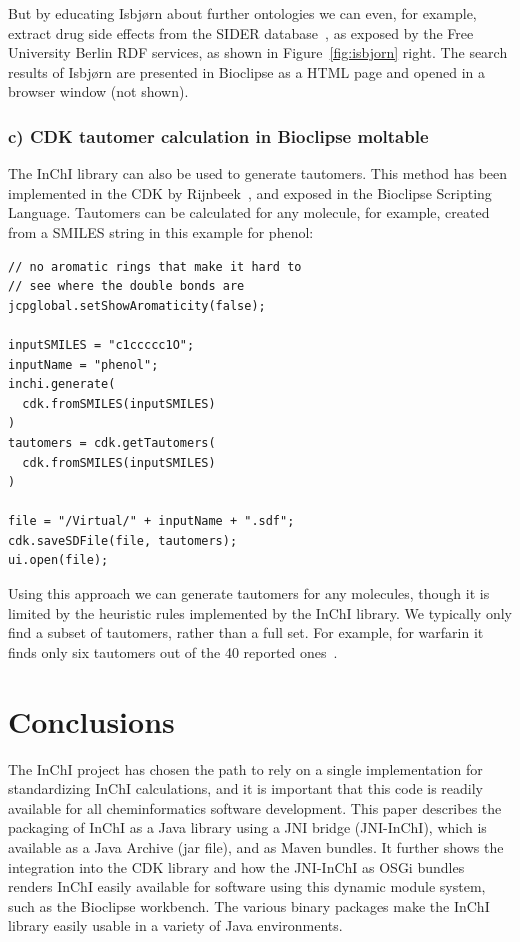 \documentclass[10pt]{bmc_article}
\newenvironment{bmcformat}{\fussy\setboolean{publ}{true}}{\fussy}
\begin{document}
\begin{bmcformat}
But by educating Isbjørn about further ontologies we can even, for example, extract drug side effects
from the SIDER database~\cite{Kuhn2010}, as exposed by the Free University Berlin RDF services,
as shown in Figure~\ref{fig:isbjorn} right. The search results of Isbjørn are presented in Bioclipse
as a HTML page and opened in a browser window (not shown).

\subsubsection*{c) CDK tautomer calculation in Bioclipse moltable}

The InChI library can also be used to generate tautomers\cite{Thalheim2010}. This method has been
implemented in the CDK by Rijnbeek~\cite{Rijnbeek2011}, and exposed in the Bioclipse Scripting Language.
Tautomers can be calculated for any molecule, for example, created from a SMILES string in this
example for phenol:

\begin{verbatim}
// no aromatic rings that make it hard to
// see where the double bonds are
jcpglobal.setShowAromaticity(false);

inputSMILES = "c1ccccc1O";
inputName = "phenol";
inchi.generate(
  cdk.fromSMILES(inputSMILES)
)
tautomers = cdk.getTautomers(
  cdk.fromSMILES(inputSMILES)
)

file = "/Virtual/" + inputName + ".sdf";
cdk.saveSDFile(file, tautomers);
ui.open(file);
\end{verbatim}

Using this approach we can generate tautomers for any molecules, though it is limited by
the heuristic rules implemented by the InChI library. We typically only find a subset
of tautomers, rather than a full set. For example, for warfarin it finds only six tautomers
out of the 40 reported ones~\cite{Porter2010}.

\section*{Conclusions}
The InChI project has chosen the path to rely on a single implementation for standardizing InChI calculations,
and it is important that this code is readily available for all cheminformatics software development. This paper
describes the packaging of InChI as a Java library using a JNI bridge (JNI-InChI), which is available as a Java
Archive (jar file), and as Maven bundles. It further shows the integration into the CDK library and
how the JNI-InChI as OSGi bundles renders InChI easily available for software using this dynamic module system,
such as the Bioclipse workbench. The various binary packages make the InChI library easily usable in
a variety of Java environments.


\end{bmcformat}
\end{document}
